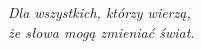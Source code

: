 \thispagestyle{empty}
\vspace*{0.3\textheight}
\begin{center}
\large\itshape\color{textmuted}
Dla wszystkich, którzy wierzą,\\
że słowa mogą zmieniać świat.
\end{center}
\vspace*{\fill}
\cleardoublepage